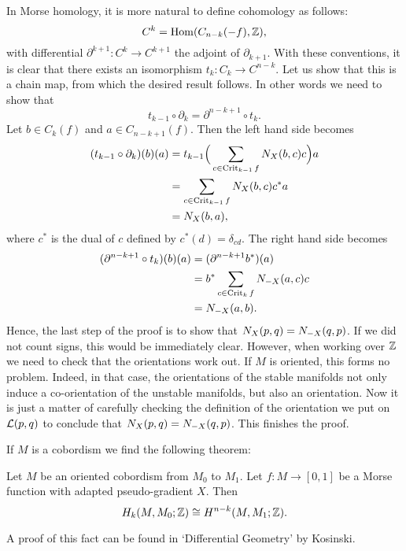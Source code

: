 \begin{myproof}
    In Morse homology, it is more natural to define cohomology as follows:
    \[
        C^{k} = \operatorname{Hom}(C_{n-k}(-f), \mathbb{Z})
    ,\]
    with differential $\partial^{k+1}:C^{k} \to  C^{k+1}$ the adjoint of $\partial_{k+1}$.
    With these conventions, it is clear that there exists an isomorphism $t_k: C_k \to  C^{n-k}$. 
    Let us show that this is a chain map, from which the desired result follows.
    In other words we need to show that
    \[
    t_{k-1}  \circ  \partial_k = \partial^{n-k+1}  \circ  t_k
    .\] 
    Let $b \in C_k(f)$ and $a \in C_{n-k+1}(f)$.
    Then the left hand side becomes
    \begin{align*}
        (t_{k-1}  \circ  \partial_k)(b)(a)
        &= t_{k-1}\Big(\sum_{c \in \operatorname{Crit}_{k-1}f} N_{X}(b, c) c\Big) a \\
        &= \sum_{c \in \operatorname{Crit}_{k-1}f} N_{X}(b, c) c^{*} a\\
        &= N_{X}(b, a)
    ,\end{align*} 
    where $c^{*}$ is the dual of $c$ defined by $c^{*}(d) = \delta_{cd}$.
    The right hand side becomes
    \begin{align*}
        (\partial^{n-k+1}  \circ  t_k)(b)(a) &= (\partial^{n-k+1}  b^{*})(a)\\
                                          &= b^{*} \sum_{c \in \operatorname{Crit}_k f} N_{-X}(a, c) c\\
                                          &= N_{-X}(a, b)
    .\end{align*} 
    Hence, the last step of the proof is to show that $N_{X}(p, q) = N_{-X}(q, p)$.
    If we did not count signs, this would be immediately clear.
    However, when working over $\mathbb{Z}$ we need to check that the orientations work out.
    If $M$ is oriented, this forms no problem.
    Indeed, in that case, the orientations of the stable manifolds not only induce a co-orientation of the unstable manifolds, but also an orientation.
    Now it is just a matter of carefully checking the definition of the orientation we put on $\mathcal L(p, q)$ to conclude that $N_{X}(p, q) = N_{-X}(q, p)$.
    This finishes the proof.
\end{myproof}

If $M$ is a cobordism we find the following theorem:
\begin{theorem}
    Let $M$ be an oriented cobordism from  $M_0$ to $M_1$.
    Let $f: M \to  [0,1]$ be a Morse function with adapted pseudo-gradient $X$.
    Then
     \[
         H_k(M, M_0; \mathbb{Z}) \cong H^{n-k}(M, M_1; \mathbb{Z})
    .\] 
\end{theorem}
A proof of this fact can be found in `Differential Geometry' by Kosinski.

